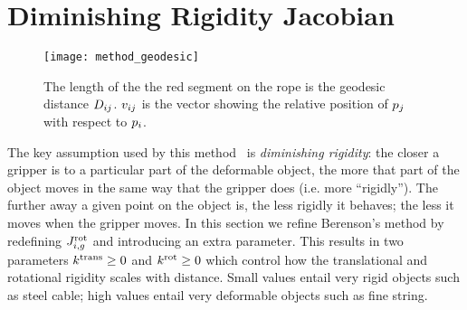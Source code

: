 
\section{Diminishing Rigidity Jacobian}
\label{sec:diminishing_rigidity}

\begin{figure}[t]
    \centering
    \texttt{[image: method\_geodesic]}
    \caption{The length of the the red segment on the rope is the geodesic distance $D_{i j}$. $v_{i j}$ is the vector showing the relative position of $p_j$ with respect to $p_i$. }
    \label{fig:distance_vec_defs}
\end{figure}

The key assumption used by this method~\cite{Berenson2013} is \textit{diminishing rigidity}: the closer a gripper is to a particular part of the deformable object, the more that part of the object moves in the same way that the gripper does (i.e. more ``rigidly''). The further away a given point on the object is, the less rigidly it behaves; the less it moves when the gripper moves. In this section we refine Berenson's method by redefining $J^{\textrm{rot}}_{i, g}$ and introducing an extra parameter. This results in two parameters $k^{\textrm{trans}} \geq 0$ and $k^{\textrm{rot}} \geq 0$ which control how the translational and rotational rigidity scales with distance. Small values entail very rigid objects such as steel cable; high values entail very deformable objects such as fine string.


